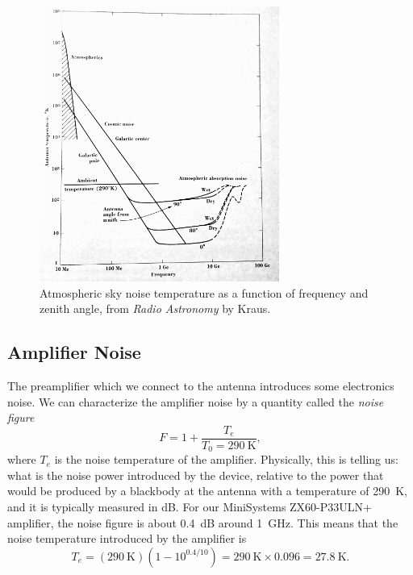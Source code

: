 \documentclass[11pt]{amsart}
\begin{document}
\begin{figure}
\begin{center}
\includegraphics[width=0.7\textwidth]{figures/atmosphericnoise.png}
\end{center}
\caption{Atmospheric sky noise temperature as a function of frequency and zenith angle, from \emph{Radio Astronomy} by Kraus.\label{fig:atmosphericnoise}}
\end{figure}

\subsection{Amplifier Noise}
The preamplifier which we connect to the antenna introduces some electronics noise. We can characterize the amplifier noise by a quantity called the \emph{noise figure}
\begin{equation}
F = 1 + \frac{T_e}{T_0 = 290~\textrm{K}},
\end{equation}
where $T_e$ is the noise temperature of the amplifier. Physically, this is telling us: what is the noise power introduced by the device, relative to the power that would be produced by a blackbody at the antenna with a temperature of 290~K, and it is typically measured in dB. For our MiniSystems ZX60-P33ULN+ amplifier, the noise figure is about 0.4~dB around 1~GHz. This means that the noise temperature introduced by the amplifier is
\begin{equation}
T_e = (290~\textrm{K}) (1 - 10^{0.4 / 10}) = 290~\textrm{K} \times 0.096 = 27.8~\textrm{K}.
\end{equation}
\end{document}
